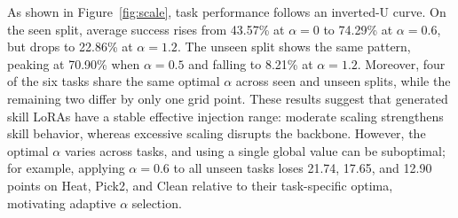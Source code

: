 As shown in Figure~\ref{fig:scale}, task performance follows an inverted-U curve. On the seen split, average success rises from 43.57\% at $\alpha{=}0$ to 74.29\% at $\alpha{=}0.6$, but drops to 22.86\% at $\alpha{=}1.2$. The unseen split shows the same pattern, peaking at 70.90\% when $\alpha{=}0.5$ and falling to 8.21\% at $\alpha{=}1.2$. Moreover, four of the six tasks share the same optimal $\alpha$ across seen and unseen splits, while the remaining two differ by only one grid point. These results suggest that generated skill LoRAs have a stable effective injection range: moderate scaling strengthens skill behavior, whereas excessive scaling disrupts the backbone.
However, the optimal $\alpha$ varies across tasks, and using a single global value can be suboptimal; for example, applying $\alpha{=}0.6$ to all unseen tasks loses 21.74, 17.65, and 12.90 points on Heat, Pick2, and Clean relative to their task-specific optima, motivating adaptive $\alpha$ selection.

